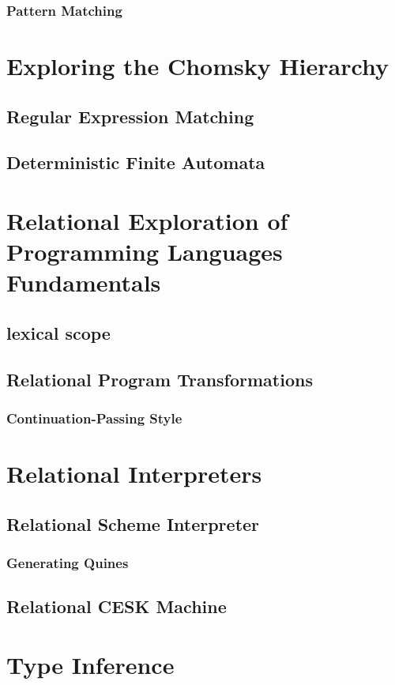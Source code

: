 \documentclass[11pt]{book}
\begin{document}
\begin{schemeregion}
\subsection{Pattern Matching}

\chapter{Exploring the Chomsky Hierarchy}
\section{Regular Expression Matching}
\section{Deterministic Finite Automata}

\chapter{Relational Exploration of Programming Languages Fundamentals}
\section{lexical scope}
\section{Relational Program Transformations}
\subsection{Continuation-Passing Style}

\chapter{Relational Interpreters}
\section{Relational Scheme Interpreter}
\subsection{Generating Quines}
\section{Relational CESK Machine}

\chapter{Type Inference}

\end{schemeregion}
\end{document}
